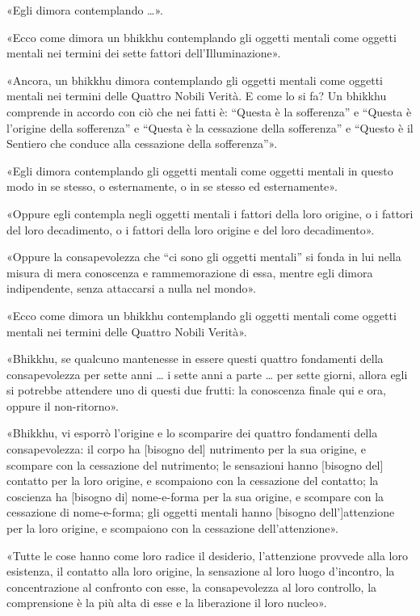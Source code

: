 «Egli dimora contemplando …».

«Ecco come dimora un bhikkhu contemplando gli oggetti mentali come oggetti
mentali nei termini dei sette fattori dell’Illuminazione».

«Ancora, un bhikkhu dimora contemplando gli oggetti mentali come oggetti mentali
nei termini delle Quattro Nobili Verità. E come lo si fa? Un bhikkhu comprende
in accordo con ciò che nei fatti è: “Questa è la sofferenza” e “Questa è
l’origine della sofferenza” e “Questa è la cessazione della sofferenza” e
“Questo è il Sentiero che conduce alla cessazione della sofferenza”».

«Egli dimora contemplando gli oggetti mentali come oggetti mentali in questo
modo in se stesso, o esternamente, o in se stesso ed esternamente».

«Oppure egli contempla negli oggetti mentali i fattori della loro origine, o i
fattori del loro decadimento, o i fattori della loro origine e del loro
decadimento».

«Oppure la consapevolezza che “ci sono gli oggetti mentali” si fonda in lui
nella misura di mera conoscenza e rammemorazione di essa, mentre egli dimora
indipendente, senza attaccarsi a nulla nel mondo».

«Ecco come dimora un bhikkhu contemplando gli oggetti mentali come oggetti
mentali nei termini delle Quattro Nobili Verità».

«Bhikkhu, se qualcuno mantenesse in essere questi quattro fondamenti della
consapevolezza per sette anni … i sette anni a parte … per sette giorni, allora
egli si potrebbe attendere uno di questi due frutti: la conoscenza finale qui e
ora, oppure il non-ritorno».


«Bhikkhu, vi esporrò l’origine e lo scomparire dei quattro fondamenti della
consapevolezza: il corpo ha [bisogno del] nutrimento per la sua origine, e
scompare con la cessazione del nutrimento; le sensazioni hanno [bisogno del]
contatto per la loro origine, e scompaiono con la cessazione del contatto; la
coscienza ha [bisogno di] nome-e-forma per la sua origine, e scompare con la
cessazione di nome-e-forma; gli oggetti mentali hanno [bisogno dell’]attenzione
per la loro origine, e scompaiono con la cessazione dell’attenzione».


«Tutte le cose hanno come loro radice il desiderio, l’attenzione provvede alla
loro esistenza, il contatto alla loro origine, la sensazione al loro luogo
d’incontro, la concentrazione al confronto con esse, la consapevolezza al loro
controllo, la comprensione è la più alta di esse e la liberazione il loro
nucleo».

